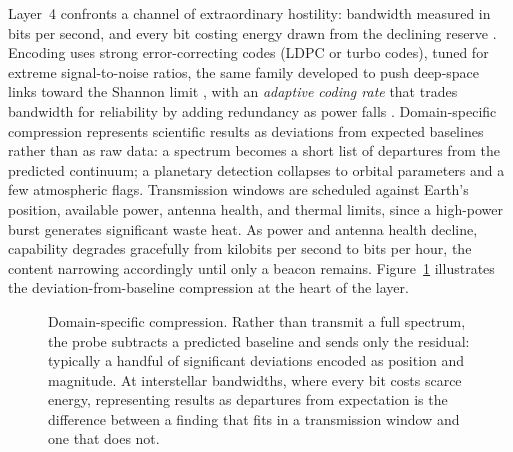\documentclass[10pt, a4paper]{article}
\begin{document}
Layer~4 confronts a channel of extraordinary hostility: bandwidth measured in bits per second, and every bit costing energy drawn from the declining reserve \cite{shannon1948}. Encoding uses strong error-correcting codes (LDPC or turbo codes), tuned for extreme signal-to-noise ratios, the same family developed to push deep-space links toward the Shannon limit \cite{andrews2007}, with an \textit{adaptive coding rate} that trades bandwidth for reliability by adding redundancy as power falls \cite{gallager1962, berrou1993}. Domain-specific compression represents scientific results as deviations from expected baselines rather than as raw data: a spectrum becomes a short list of departures from the predicted continuum; a planetary detection collapses to orbital parameters and a few atmospheric flags. Transmission windows are scheduled against Earth's position, available power, antenna health, and thermal limits, since a high-power burst generates significant waste heat. As power and antenna health decline, capability degrades gracefully from kilobits per second to bits per hour, the content narrowing accordingly until only a beacon remains. Figure~\ref{fig:compression} illustrates the deviation-from-baseline compression at the heart of the layer.

\begin{figure}[ht]
\centering
{}
\caption{Domain-specific compression. Rather than transmit a full spectrum, the probe subtracts a predicted baseline and sends only the residual: typically a handful of significant deviations encoded as position and magnitude. At interstellar bandwidths, where every bit costs scarce energy, representing results as departures from expectation is the difference between a finding that fits in a transmission window and one that does not.}
\label{fig:compression}
\end{figure}
\end{document}
